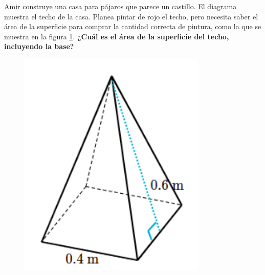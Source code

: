 \question[10] Amir construye una casa para pájaros que parece un castillo. El diagrama muestra el techo de la casa.
Planea pintar de rojo el techo, pero necesita saber el área de la superficie para comprar la cantidad correcta de pintura,
como la que se muestra en la figura \ref{fig:prob_verb_superficie_06}.
\textbf{¿Cuál es el área de la superficie del techo, incluyendo la base?}

\begin{minipage}{0.3\linewidth}
    \begin{figure}[H]
        \begin{center}
            \includegraphics[width=0.8\textwidth]{../images/prob_verb_superficie_06}
        \end{center}
        \caption{}
        \label{fig:prob_verb_superficie_06}
    \end{figure}
\end{minipage}
\begin{minipage}{0.7\linewidth}
    \begin{solutionbox}{6cm}
    \end{solutionbox}
\end{minipage}